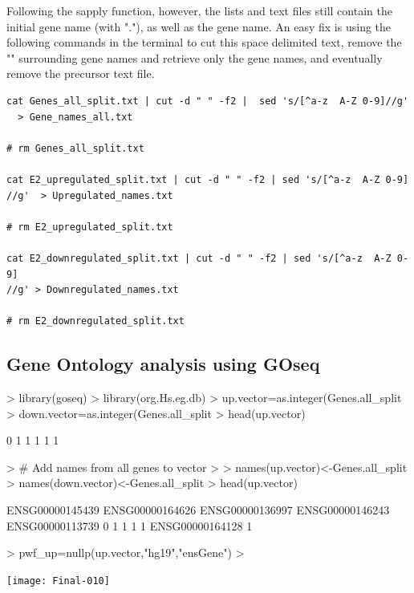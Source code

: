 \documentclass[a4paper,11pt]{article}
\begin{document}
Following the sapply function, however, the lists and text files still contain the initial gene name (with "."), as well as the gene name. An easy fix is using the following commands in the terminal to cut this space delimited text, remove the "" surrounding gene names and retrieve only the gene names, and eventually remove the precursor text file.

\begin{verbatim}
cat Genes_all_split.txt | cut -d " " -f2 |  sed 's/[^a-z  A-Z 0-9]//g'
  > Gene_names_all.txt 

# rm Genes_all_split.txt

cat E2_upregulated_split.txt | cut -d " " -f2 | sed 's/[^a-z  A-Z 0-9]
//g'  > Upregulated_names.txt

# rm E2_upregulated_split.txt

cat E2_downregulated_split.txt | cut -d " " -f2 | sed 's/[^a-z  A-Z 0-9]
//g' > Downregulated_names.txt

# rm E2_downregulated_split.txt
\end{verbatim}

\subsection{Gene Ontology analysis using GOseq}

\begin{Schunk}
\begin{Sinput}
> library(goseq)
> library(org.Hs.eg.db)
> up.vector=as.integer(Genes.all_split%
> down.vector=as.integer(Genes.all_split%
> head(up.vector)
\end{Sinput}
\begin{Soutput}
[1] 0 1 1 1 1 1
\end{Soutput}
\begin{Sinput}
> # Add names from all genes to vector
> 
> names(up.vector)<-Genes.all_split
> names(down.vector)<-Genes.all_split
> head(up.vector)
\end{Sinput}
\begin{Soutput}
ENSG00000145439 ENSG00000164626 ENSG00000136997 ENSG00000146243 ENSG00000113739 
              0               1               1               1               1 
ENSG00000164128 
              1 
\end{Soutput}
\begin{Sinput}
> pwf_up=nullp(up.vector,"hg19","ensGene")
> 
\end{Sinput}
\end{Schunk}
\texttt{[image: Final-010]}
\end{document}
